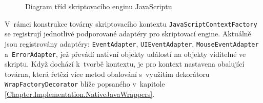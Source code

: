 \begin{figure}[H]
  \begin{center}
    \caption{Diagram tříd skriptovacího enginu JavaScriptu}
    \label{Figure.WindowJavaScriptEngine}
  \end{center}
\end{figure}

\vspace{-1em}

V~rámci konstrukce továrny skriptovacího kontextu \texttt{JavaScriptContextFactory} se registrují jednotlivé podporované adaptéry pro skriptovací engine. Aktuálně jsou registrovány adaptéry: \texttt{EventAdapter}, \texttt{UIEventAdapter}, \texttt{MouseEventAdapter} a~\texttt{ErrorAdapter}, jež převádí nativní objekty událostí na objekty viditelné ve skriptu. Když dochází k~tvorbě kontextu, je pro kontext nastavena obalující továrna, která řetězí více metod obalování s~využitím dekorátoru \texttt{WrapFactoryDecorator} blíže popsaného v~kapitole \ref{Chapter.Implementation.NativeJavaWrappers}.

